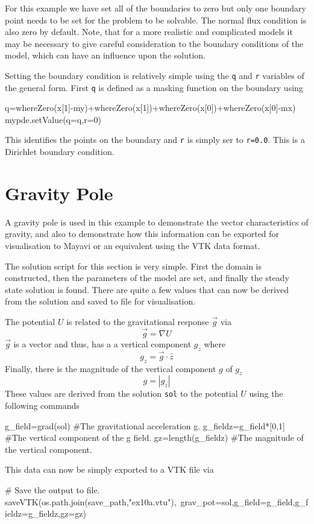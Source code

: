 For this example we have set all of the boundaries to zero but only one boundary
point needs to be set for the problem to be solvable. The normal flux condition
is also zero by default. Note, that for a more realistic and complicated models
it may be necessary to give careful consideration to the boundary conditions of the model,
which can have an influence upon the solution.

Setting the boundary condition is relatively simple using the \verb!q! and
\verb!r! variables of the general form. First \verb!q! is defined as a masking
function on the boundary using
\begin{python}
q=whereZero(x[1]-my)+whereZero(x[1])+whereZero(x[0])+whereZero(x[0]-mx)
mypde.setValue(q=q,r=0)
\end{python}
This identifies the points on the boundary and \verb!r! is simply
ser to \verb!r=0.0!. This is a Dirichlet boundary condition.

\clearpage
\section{Gravity Pole}
A gravity pole is used in this example to demonstrate the vector characteristics
of gravity, and also to demonstrate how this information can be exported for
visualisation to Mayavi or an equivalent using the VTK data format.

The solution script for this section is very simple. First the domain is
constructed, then the parameters of the model are set, and finally the steady
state solution is found. There are quite a few values that can now be derived
from the solution and saved to file for visualisation.

The potential $U$ is related to the gravitational response $\vec{g}$ via
\begin{equation}
\vec{g} = \nabla U
\end{equation}
$\vec{g}$ is a vector and thus, has a a vertical component $g_{z}$ where
\begin{equation}
g_{z}=\vec{g}\cdot\hat{z}
\end{equation}
Finally, there is the magnitude of the vertical component $g$ of
$g_{z}$
\begin{equation}
g=|g_{z}|
\end{equation}
These values are derived from the \esc solution \verb!sol! to the potential $U$
using the following commands
\begin{python}
g_field=grad(sol) #The gravitational acceleration g.
g_fieldz=g_field*[0,1] #The vertical component of the g field.
gz=length(g_fieldz) #The magnitude of the vertical component.
\end{python}
This data can now be simply exported to a VTK file via
\begin{python}
# Save the output to file.
saveVTK(os.path.join(save_path,"ex10a.vtu"),\
        grav_pot=sol,g_field=g_field,g_fieldz=g_fieldz,gz=gz)
\end{python}

